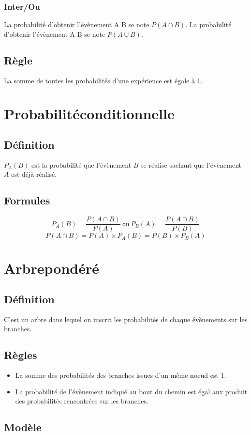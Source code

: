 \documentclass[a4paper,twoside,10pt,french,twocolumn]{scrartcl}
\begin{document}
\subsubsection{Inter/Ou}
La probabilité d'obtenir l'évènement A  B se note $P(A \cap B)$.
La probabilité d'obtenir l'évènement A  B se note $P(A \cup B)$.
\subsection{Règle}
La somme de toutes les probabilités d'une expérience est égale à 1.
\section{Probabilité\:conditionnelle}
\subsection{Définition}
$P_A(B)$ est la probabilité que l'évènement $B$ se réalise sachant que l'évènement $A$ est déjà réalisé.
\subsection{Formules}
\[P_A(B) = \frac{P(A \cap B)}{P(A)} \: \texttt{ou} \: P_B(A) = \frac{P(A \cap B)}{P(B)}\]
\[P(A \cap B) = P(A) \times P_A(B) = P(B) \times P_B(A)\]
\section{Arbre\:pondéré}
\subsection{Définition}
C'est un arbre dans lequel on inscrit les probabilités de chaque évènements sur les branches.
\subsection{Règles}
\begin{itemize}
\item La somme des probabilités des branches issues d'un même noeud est 1. 
\item La probabilité de l'évènement indiqué au bout du chemin est égal aux produit des probabilités rencontrées sur les branches.
\end{itemize}
\subsection{Modèle}
\end{document}

